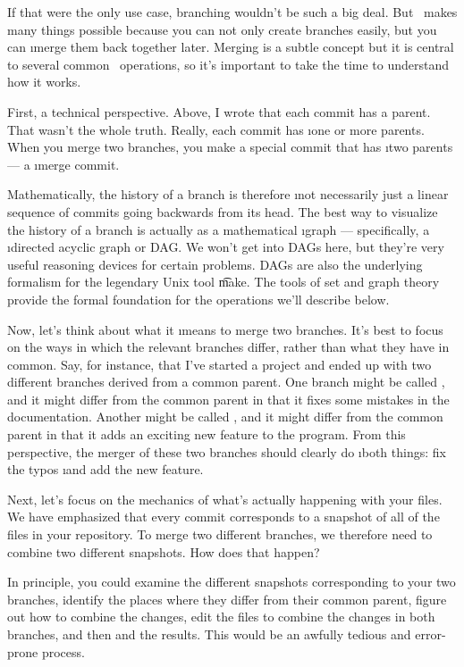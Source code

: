 \documentclass[letterpaper, 12pt, titlepage, twoside]{article}
\begin{document}
If that were the only use case, branching wouldn't be such a big deal. But
\git\ makes many things possible because you can not only create branches
easily, but you can \i{merge} them back together later. Merging is a subtle
concept but it is central to several common \git\ operations, so it's
important to take the time to understand how it works.

First, a technical perspective. Above, I wrote that each commit has a parent.
That wasn't the whole truth. Really, each commit has \i{one or more parents}.
When you merge two branches, you make a special commit that has \i{two}
parents --- a \i{merge commit}.

Mathematically, the history of a branch is therefore \i{not} necessarily just
a linear sequence of commits going backwards from its head. The best way to
visualize the history of a branch is actually as a mathematical \i{graph} ---
specifically, a \i{directed acyclic graph} or DAG. We won't get into DAGs
here, but they're very useful reasoning devices for certain problems. DAGs are
also the underlying formalism for the legendary Unix tool \t{make}. The tools
of set and graph theory provide the formal foundation for the operations we'll
describe below.

Now, let's think about what it \i{means} to merge two branches. It's best to
focus on the ways in which the relevant branches differ, rather than what they
have in common. Say, for instance, that I've started a project and ended up
with two different branches derived from a common parent. One branch might be
called , and it might differ from the common parent in that it
fixes some mistakes in the documentation. Another might be called
, and it might differ from the common parent in that it adds an
exciting new feature to the program. From this perspective, the merger of
these two branches should clearly do \i{both} things: fix the typos \i{and}
add the new feature.

Next, let's focus on the mechanics of what's actually happening with your
files. We have emphasized that every commit corresponds to a snapshot of all
of the files in your repository. To merge two different branches, we therefore
need to combine two different snapshots. How does that happen?

In principle, you could examine the different snapshots corresponding to your
two branches, identify the places where they differ from their common parent,
figure out how to combine the changes, edit the files to combine the changes
in both branches, and then  and  the results. This would
be an awfully tedious and error-prone process.
\end{document}
